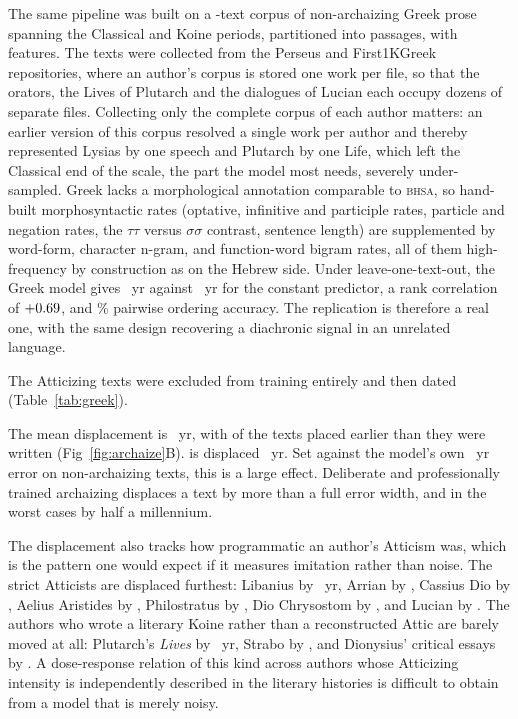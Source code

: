 \documentclass[10pt,letterpaper]{article}
\newcommand{\bhsa}{\textsc{bhsa}}
\begin{document}
The same pipeline was built on a \GKtexts-text corpus of non-archaizing Greek
prose spanning the Classical and Koine periods, partitioned into \GKchunks{}
passages, with \GKfeat{} features.  The texts were collected from the Perseus
and First1KGreek repositories, where an author's corpus is stored one work per
file, so that the orators, the Lives of Plutarch and the dialogues of Lucian
each occupy dozens of separate files.  Collecting only the complete corpus of
each author matters: an earlier version of this corpus resolved a single work
per author and thereby represented Lysias by one speech and Plutarch by one
Life, which left the Classical end of the scale, the part the model most needs,
severely under-sampled.  Greek lacks a morphological annotation
comparable to \bhsa{}, so hand-built morphosyntactic rates (optative, infinitive
and participle rates, particle and negation rates, the $\tau\tau$ versus
$\sigma\sigma$ contrast, sentence length) are supplemented by word-form,
character n-gram, and function-word bigram rates, all of them high-frequency by
construction as on the Hebrew side.  Under leave-one-text-out, the Greek model
gives \GKmae~yr against \GKmaebase~yr for the constant predictor, a rank
correlation of $+0.69$, and \GKpair\% pairwise ordering accuracy.  The
replication is therefore a real one, with the same design recovering a
diachronic signal in an unrelated language.

The \GKatt{} Atticizing texts were excluded from training entirely and then
dated (Table~\ref{tab:greek}).



The mean displacement is \GKattshift~yr, with \GKattearly{} of the \GKatt{}
texts placed earlier than they were written (Fig~\ref{fig:archaize}B).
\GKattmaxname{} is displaced \GKattmaxearly~yr.  Set against the model's own
\GKmae~yr error on non-archaizing texts, this is a large effect.  Deliberate
and professionally trained archaizing displaces a text by more than a full
error width, and in the worst cases by half a millennium.

The displacement also tracks how programmatic an author's Atticism was, which is
the pattern one would expect if it measures imitation rather than noise.  The
strict Atticists are displaced furthest: Libanius by \GKattmaxearly~yr, Arrian
by \GKaArr, Cassius Dio by \GKaDio, Aelius Aristides by \GKaAris,
Philostratus by \GKaPhil, Dio Chrysostom by \GKaChrys, and Lucian by \GKaLuc.  The authors who wrote a literary Koine
rather than a reconstructed Attic are barely moved at all: Plutarch's
\textit{Lives} by \GKaPlut~yr, Strabo by \GKaStrab, and Dionysius' critical
essays by \GKaDionEss.
A dose-response relation of this kind across authors whose Atticizing intensity
is independently described in the literary histories is difficult to obtain from
a model that is merely noisy.
\end{document}
